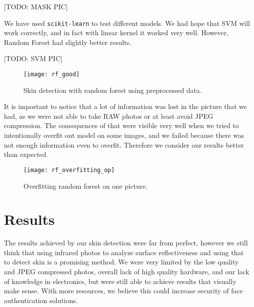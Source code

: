                 [TODO: MASK PIC]

                We have used \texttt{scikit-learn} to test different models.
                We had hope that SVM will work correctly,
                and in fact with linear kernel it worked very well.
                However, Random Forest had slightly better results.

                [TODO: SVM PIC]

                \begin{figure}[H]
                    \caption{Skin detection with random forest using preprocessed data.}
                    \centering
                    \texttt{[image: rf\_good]}
                    \label{fig:rf_good}
                \end{figure}

                It is important to notice that a lot of information was lost in the
                picture that we had, as we were not able to take RAW photos or at least
                avoid JPEG compression.
                The consequences of that were visible very well when we tried to
                intentionally overfit out model on some images, and we failed
                because there was not enough information even to overfit.
                Therefore we consider our results better than expected.

                 \begin{figure}[H]
                    \caption{Overfitting random forest on one picture.}
                    \centering
                    \texttt{[image: rf\_overfitting\_op]}
                    \label{fig:rf_overfitting_op}
                \end{figure}

    \section{Results}
        The results achieved by our skin detection were far from perfect,
        however we still think that using infrared photos to analyze surface
        reflectiveness and using that to detect skin is a promising method.
        We were very limited by the low quality and JPEG compressed photos,
        overall lack of high quality hardware, and our lack of knowledge in electronics,
        but were still able to achieve results that visually make sense.
        With more resources, we believe this could increase security of
        face authentication solutions.

